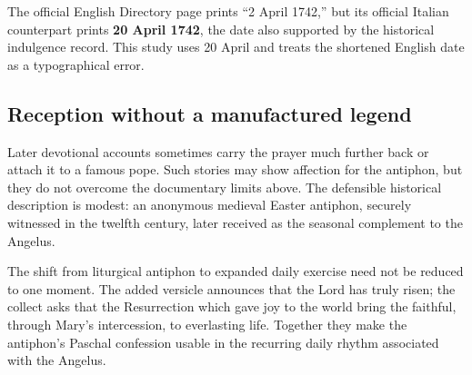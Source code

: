 The official English Directory page prints ``2 April 1742,'' but its official Italian counterpart prints \textbf{20 April 1742}, the date also supported by the historical indulgence record. This study uses 20 April and treats the shortened English date as a typographical error.

\subsection{Reception without a manufactured legend}

Later devotional accounts sometimes carry the prayer much further back or attach it to a famous pope. Such stories may show affection for the antiphon, but they do not overcome the documentary limits above. The defensible historical description is modest: an anonymous medieval Easter antiphon, securely witnessed in the twelfth century, later received as the seasonal complement to the Angelus.

The shift from liturgical antiphon to expanded daily exercise need not be reduced to one moment. The added versicle announces that the Lord has truly risen; the collect asks that the Resurrection which gave joy to the world bring the faithful, through Mary's intercession, to everlasting life. Together they make the antiphon's Paschal confession usable in the recurring daily rhythm associated with the Angelus.
